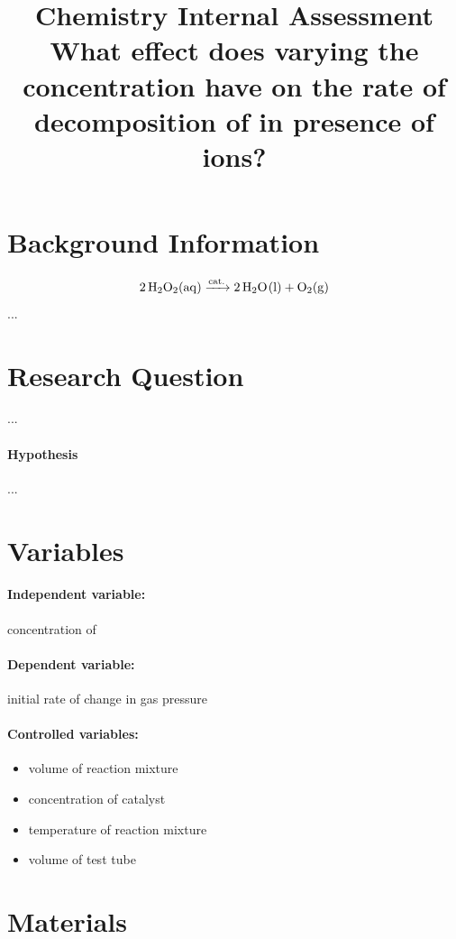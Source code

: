 \documentclass[a4paper, 12pt]{article}
\title{
\textbf{Chemistry Internal Assessment}\\
\bigskip
What effect does varying the concentration have on the rate of decomposition of \ce{H2O2} in presence of \ce{Fe^3+} ions?
}
\author{}
\date{}
\begin{document}
\maketitle

\section*{Background Information}
$$\ce{2 H2O2(aq) ->[{cat.}] 2 H2O(l) + O2(g)}$$
...

\section*{Research Question}
...
\paragraph{Hypothesis} ...

\section*{Variables}
\paragraph{Independent variable:}
concentration of 

\paragraph{Dependent variable:}
initial rate of change in gas pressure

\paragraph{Controlled variables:}
\begin{itemize}
    \itemsep 0em
    \item volume of reaction mixture
    \item concentration of  catalyst
    \item temperature of reaction mixture
    \item volume of test tube
\end{itemize}

\section*{Materials}
\end{document}
